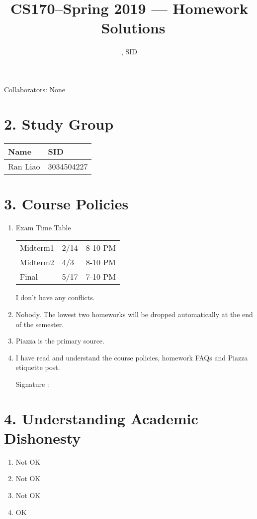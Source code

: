 \documentclass[11pt]{article}
\title{CS170--Spring 2019 --- Homework \Homework\ Solutions}
\author{\Name, SID \SID}
\date{}
\newenvironment{qparts}{\begin{enumerate}[{(}a{)}]}{\end{enumerate}}
\begin{document}
\maketitle
Collaborators: None

\section*{2. Study Group}
\begin{tabular}{ll}
    Name        &   SID         \\\hline
    Ran Liao    &   3034504227  \\   
\end{tabular}

\newpage
\section*{3. Course Policies}
\begin{qparts}
\item Exam Time Table

\begin{tabular}{lll}
    Midterm1    &   2/14    &   8-10 PM     \\   
    Midterm2    &   4/3     &   8-10 PM     \\   
    Final       &   5/17    &   7-10 PM     \\   
\end{tabular}

I don't have any conflicts.

\item Nobody. The lowest two homeworks will be dropped automatically at the end of the semester.

\item Piazza is the primary source.

\item I have read and understand the course policies, homework FAQs and Piazza etiquette post.

Signature : 

\end{qparts}

\newpage
\section*{4. Understanding Academic Dishonesty}
\begin{qparts}
\item Not OK
\item Not OK
\item Not OK
\item OK

\end{qparts}
\end{document}
